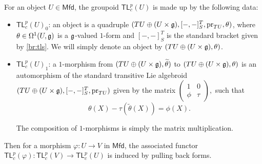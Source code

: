 \documentclass[letterpaper,10pt, oneside]{article} %
\newcommand{\calc}[1]{} %
\newcommand{\Mfd}{\mathsf{Mfd}}%
\newcommand{\tlp}{{\mathsf{TL}^{p}_{c}}} %
\newcommand{\brtls}[1]{   [    #1   ]_S^T   }
\newcommand{\pr}{\mathrm{pr}}
\begin{document}
For an object $U\in \Mfd$, the groupoid $\tlp(U)$ is made up
by the following data:
\begin{itemize}
\item{$\tlp(U)_0$}: an object is a quadruple $(TU\oplus (U\times\g), \brtls{-,-},\pr_{TU}, \theta)$, where $\theta\in \Omega^1(U,\mathfrak g)$ is a $\mathfrak g$-valued $1$-form and $\brtls{-,-}$
  is the standard   bracket   given by \eqref{br:tls}. We will simply denote an object by $(TU\oplus (U\times\mathfrak g),\theta)$.

\item{$\tlp(U)_1$}:  a $1$-morphism from $(TU\oplus (U\times\mathfrak g),   \widetilde{\theta})$ to $(TU\oplus (U\times\mathfrak g),
   \theta)$ is an automorphism of the standard transitive Lie algebroid $(TU\oplus
  (U\times\g),\brtls{-,-},\pr_{TU})$ given by the
  matrix
$
\left(\begin{array}{cc}
1&0\\
\phi&\tau
\end{array} \right),
$ such that
$$
\theta(X)-\tau(\widetilde{\theta}(X))=\phi(X).
$$

 The
composition of $1$-morphisms is simply the matrix multiplication.

\end{itemize}

Then for a morphism $\varphi: U\to V$ in $\Mfd$, the associated
functor $\tlp(\varphi): \tlp(V) \to \tlp(U)$ is induced by
pulling back forms.
\calc{
more precisely, on the level of objects,
\[\tlp(\varphi)(TV\oplus (V\times\g),   \brtls{-,-},\theta_V)
= (TU\oplus (U\times\g), \brtls{-,-}, \varphi^*\theta_V)\]
and on the level of morphisms,
\[
\tlp(\varphi) \left(\begin{array}{cc}
1&0\\
\phi_V&\tau_V
\end{array} \right) = \left(\begin{array}{cc}
1&0\\
\varphi^*\phi_V&\tau_V\circ \varphi
\end{array} \right) .
\]
One may verify that $\tlp(\varphi)$ is indeed a functor between
desired categories.}
\end{document}

